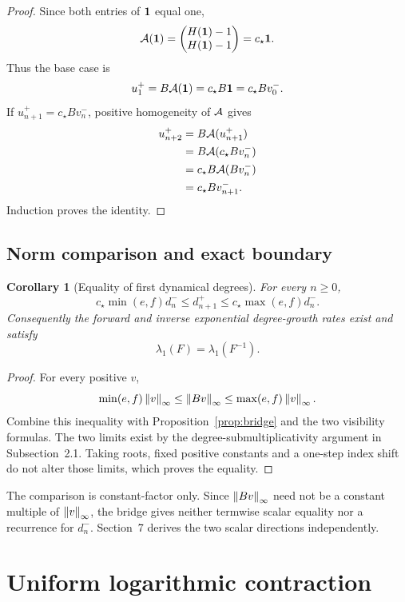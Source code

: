 \documentclass[11pt]{article}
\newtheorem{corollary}[theorem]{Corollary}
\theoremstyle{definition}
\theoremstyle{remark}
\begin{document}
\begin{proof}
Since both entries of \(\mathbf{1}\) equal one,
\[
\mathcal{A}(\mathbf{1})=
\begin{pmatrix}H(\mathbf{1})-1\\H(\mathbf{1})-1\end{pmatrix}
=c_\star\mathbf{1}.
\]
Thus the base case is
\[
u^+_1=B\mathcal{A}(\mathbf{1})=c_\star B\mathbf{1}=c_\star Bv^-_0.
\]
If \(u^+_{n+1}=c_\star Bv^-_n\), positive homogeneity of \(\mathcal{A}\)
gives
\[
\begin{aligned}
u^+_{n+2}
&=B\mathcal{A}(u^+_{n+1})\\
&=B\mathcal{A}(c_\star Bv^-_n)\\
&=c_\star B\mathcal{A}(Bv^-_n)\\
&=c_\star Bv^-_{n+1}.
\end{aligned}
\]
Induction proves the identity.
\end{proof}

\subsection{Norm comparison and exact boundary}

\begin{corollary}[Equality of first dynamical degrees]
\label{cor:rates}
For every \(n\geq0\),
\[
c_\star\min(e,f)d_n^-
\leq d_{n+1}^+
\leq c_\star\max(e,f)d_n^-.
\]
Consequently the forward and inverse exponential degree-growth rates
exist and satisfy
\[
\lambda_1(F)=\lambda_1(F^{-1}).
\]
\end{corollary}

\begin{proof}
For every positive \(v\),
\[
\min(e,f)\left\lVert v\right\rVert_{\infty}\leq\left\lVert Bv\right\rVert_{\infty}
\leq\max(e,f)\left\lVert v\right\rVert_{\infty}.
\]
Combine this inequality with Proposition~\ref{prop:bridge} and the two
visibility formulas.  The two limits exist by the
degree-submultiplicativity argument in Subsection~2.1.  Taking roots,
fixed positive constants and a one-step index shift do not alter those
limits, which proves the equality.
\end{proof}

The comparison is constant-factor only.  Since
\(\left\lVert Bv\right\rVert_{\infty}\) need not be a constant multiple of \(\left\lVert v\right\rVert_{\infty}\),
the bridge gives neither termwise scalar equality nor a recurrence for
\(d_n^-\).  Section~7 derives the two scalar directions independently.

\section{Uniform logarithmic contraction}
\end{document}
